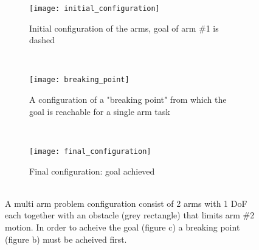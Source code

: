 \begin{figure}[t]
    \centering
    \begin{subfigure}[b]{0.3\textwidth}
    		\centering
        \texttt{[image: initial\_configuration]}
        \caption{Initial configuration of the arms, goal of arm \#1 is dashed \\ }
        \label{fig:initial_configuration}
    \end{subfigure}
    ~
    \begin{subfigure}[b]{0.3\textwidth}
    		\centering
        \texttt{[image: breaking\_point]}
        \caption{A configuration of a "breaking point" from which the goal is reachable for a single arm task}
        \label{fig:breaking_point}
    \end{subfigure}  
    ~
    \begin{subfigure}[b]{0.3\textwidth}
    		\centering
        \texttt{[image: final\_configuration]}
        \caption{Final configuration: goal achieved \\ \\}
        \label{fig:final_configuration}
    \end{subfigure}

    \caption{A multi arm problem configuration consist of 2 arms with 1 DoF each together with an obstacle (grey rectangle) that limits arm \#2 motion. In order to acheive the goal (figure c) a breaking point (figure b) must be acheived first. }\label{fig:local_minima_example}
\end{figure}


